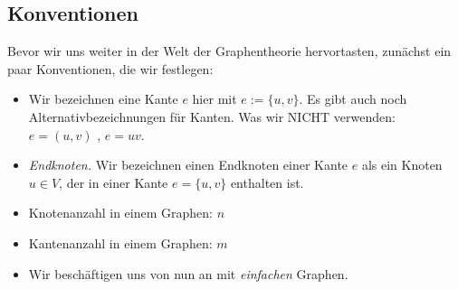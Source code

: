 \documentclass{article}
\begin{document}
\subsection{Konventionen}
Bevor wir uns weiter in der Welt der Graphentheorie hervortasten, zunächst ein paar Konventionen, die wir festlegen:
\begin{itemize}
        \item Wir bezeichnen eine  Kante \(e\) hier mit \(e:= \{u, v\}\). Es gibt auch noch Alternativbezeichnungen für Kanten. Was wir NICHT verwenden: \(e = (u, v)\) , \(e = uv\).
        \item \textit{Endknoten.} Wir bezeichnen einen Endknoten einer Kante \(e\) als ein Knoten \(u \in V\), der in einer Kante \(e = \{u, v\}\) enthalten ist. 
        \item Knotenanzahl in einem Graphen: \(n\)
        \item Kantenanzahl in einem Graphen: \(m\)
        \item Wir beschäftigen uns von nun an mit \textit{einfachen} Graphen.
    \end{itemize}

\newpage
\end{document}
